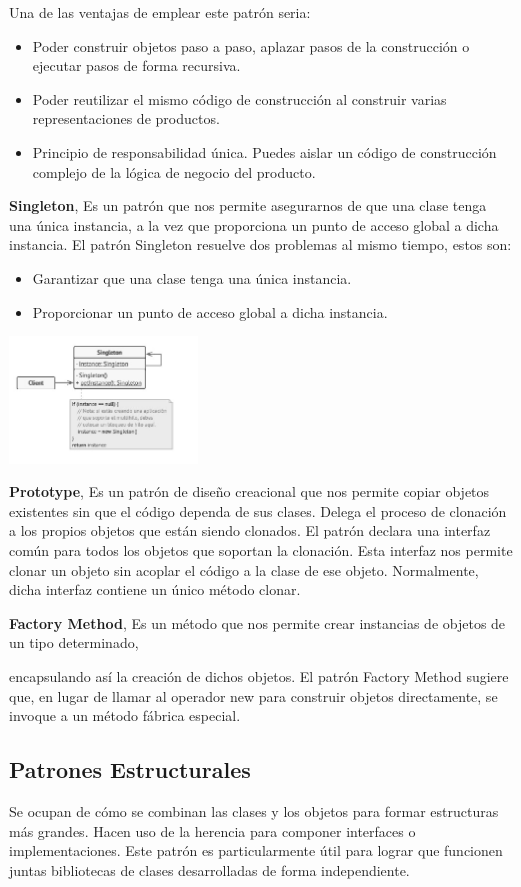 \documentclass{article}
\begin{document}
\begin{multicols}{2}
Una de las ventajas de emplear este patrón seria:
\begin{itemize}
 \item Poder construir objetos paso a paso, aplazar pasos de la construcción o ejecutar pasos de forma recursiva.
 \item Poder reutilizar el mismo código de construcción al construir varias representaciones de productos.
 \item Principio de responsabilidad única. Puedes aislar un código de construcción complejo de la lógica de negocio del producto.
\end{itemize}

\textbf{Singleton}, Es un patrón que nos permite asegurarnos de que una clase tenga una única instancia, a la vez que proporciona un punto de acceso global a dicha instancia.
El patrón Singleton resuelve dos problemas al mismo tiempo, estos son:
\begin{itemize}
 \item Garantizar que una clase tenga una única instancia.
 \item Proporcionar un punto de acceso global a dicha instancia.
\end{itemize}
\includegraphics[width=5cm]{imagen1.jpg}

\textbf{Prototype}, Es un patrón de diseño creacional que nos permite copiar objetos existentes sin que el código dependa de sus clases. Delega el proceso de clonación a los propios objetos que están siendo clonados. El patrón declara una interfaz común para todos los objetos que soportan la clonación. Esta interfaz nos permite clonar un objeto sin acoplar el código a la clase de ese objeto. Normalmente, dicha interfaz contiene un único método clonar.

\textbf{Factory Method}, Es un método que nos permite crear instancias de objetos de un tipo determinado,

encapsulando así la creación de dichos objetos. El patrón Factory Method sugiere que, en lugar de llamar al operador new para construir objetos directamente, se invoque a un método fábrica especial.

\subsection{Patrones Estructurales}
Se ocupan de cómo se combinan las clases y los objetos para formar estructuras más grandes. Hacen uso de la herencia para componer interfaces o implementaciones.
Este patrón es particularmente útil para lograr que funcionen juntas bibliotecas de clases desarrolladas de forma independiente.


\end{multicols}
\end{document}
